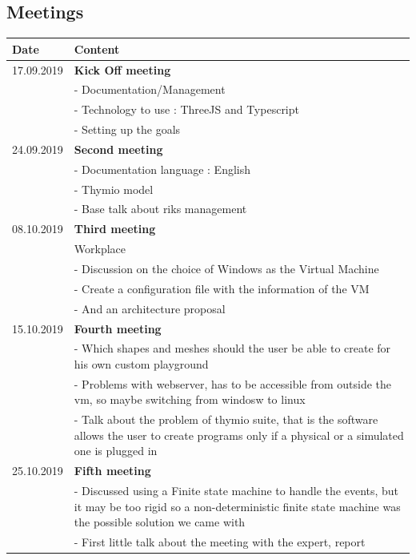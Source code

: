 \documentclass{scrartcl}
\begin{document}
\subsection{Meetings}
\begin{tabular}{ | m{3cm} | m{10cm} | }
  \hline
  Date & Content \\
  \hline
  17.09.2019 & \textbf{Kick Off meeting}\\
  & - Documentation/Management\\
  & - Technology to use : ThreeJS and Typescript\\
  & - Setting up the goals\\
  \hline
  24.09.2019 & \textbf{Second meeting} \\
  & - Documentation language : English \\
  & - Thymio model \\
  & - Base talk about riks management \\
  \hline
  08.10.2019 & \textbf{Third meeting}\\
  & Workplace\\
  & - Discussion on the choice of Windows as the Virtual Machine \\
  & - Create a configuration file with the information of the VM \\
  & - And an architecture proposal \\
  \hline
  15.10.2019 & \textbf{Fourth meeting} \\
  & - Which shapes and meshes should the user be able to create for his own custom playground \\
  & - Problems with webserver, has to be accessible from outside the vm, so maybe switching from windosw to linux \\
  & - Talk about the problem of thymio suite, that is the software allows the user to create programs only if a physical or a simulated one is plugged in \\
  \hline
  25.10.2019 & \textbf{Fifth meeting} \\
  & - Discussed using a Finite state machine to handle the events, but it may be too rigid so a non-deterministic finite state machine was the possible solution we came with \\
  & - First little talk about the meeting with the expert, report\\
  \hline
\end{tabular}

\listoffigures
\end{document}
